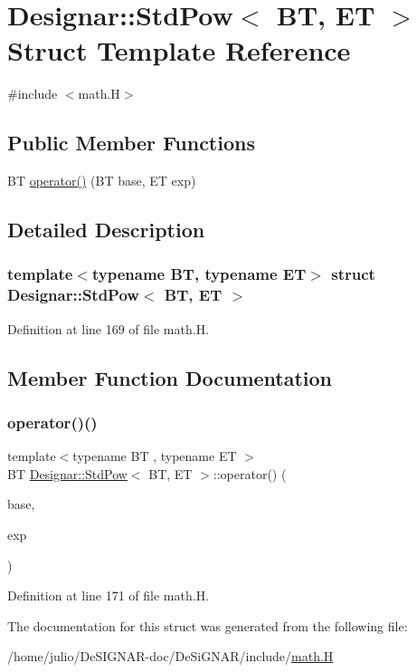 \hypertarget{struct_designar_1_1_std_pow}{}\section{Designar\+:\+:Std\+Pow$<$ BT, ET $>$ Struct Template Reference}
\label{struct_designar_1_1_std_pow}


{\ttfamily \#include $<$math.\+H$>$}

\subsection*{Public Member Functions}
\begin{DoxyCompactItemize}
\item 
BT \hyperlink{struct_designar_1_1_std_pow_a76ed6112976493eda665ec60c537145f}{operator()} (BT base, ET exp)
\end{DoxyCompactItemize}


\subsection{Detailed Description}
\subsubsection*{template$<$typename BT, typename ET$>$\newline
struct Designar\+::\+Std\+Pow$<$ B\+T, E\+T $>$}



Definition at line 169 of file math.\+H.



\subsection{Member Function Documentation}
\mbox{\label{struct_designar_1_1_std_pow_a76ed6112976493eda665ec60c537145f}} 
\subsubsection{\texorpdfstring{operator()()}{operator()()}}
{\footnotesize\ttfamily template$<$typename BT , typename ET $>$ \\
BT \hyperlink{struct_designar_1_1_std_pow}{Designar\+::\+Std\+Pow}$<$ BT, ET $>$\+::operator() (\begin{DoxyParamCaption}\item[{BT}]{base,  }\item[{ET}]{exp }\end{DoxyParamCaption})\hspace{0.3cm}{\ttfamily [inline]}}



Definition at line 171 of file math.\+H.



The documentation for this struct was generated from the following file\+:\begin{DoxyCompactItemize}
\item 
/home/julio/\+De\+S\+I\+G\+N\+A\+R-\/doc/\+De\+Si\+G\+N\+A\+R/include/\hyperlink{math_8_h}{math.\+H}\end{DoxyCompactItemize}
